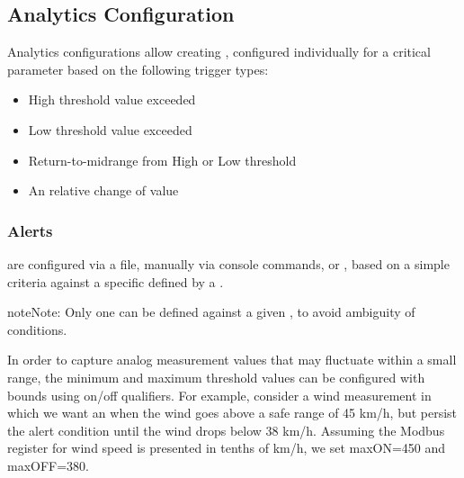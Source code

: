 \documentclass[letterpaper,10pt,english]{sphinxmanual}
\begin{document}
\subsection{Analytics Configuration}
\label{\detokenize{configuration:analytics-configuration}}
Analytics configurations allow creating , configured individually for a critical parameter based on the following trigger types:
\begin{itemize}
\item {} 
High threshold value exceeded

\item {} 
Low threshold value exceeded

\item {} 
Return-to-midrange from High or Low threshold

\item {} 
An relative change of value

\end{itemize}


\subsubsection{Alerts}
\label{\detokenize{configuration:alerts}}
 are configured via a  file, manually via console commands,  or , based on a simple criteria against a specific  defined by a .

\begin{sphinxadmonition}{note}{Note:}
Only one  can be defined against a given , to avoid ambiguity of conditions.
\end{sphinxadmonition}

In order to capture analog measurement values that may fluctuate within a small range, the minimum and maximum threshold values can be configured with bounds using on/off qualifiers.
For example, consider a wind measurement in which we want an  when the wind goes above a safe range of 45 km/h, but persist the alert condition until the wind drops below 38 km/h.
Assuming the Modbus register for wind speed is presented in tenths of km/h, we set maxON=450 and maxOFF=380.
\end{document}
